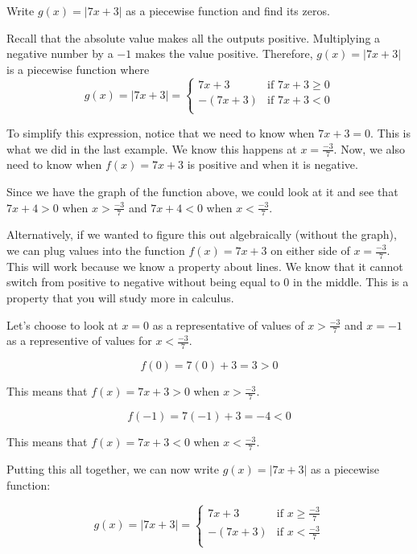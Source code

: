 \documentclass[nooutcomes]{ximera}
\begin{document}
\begin{example}
Write $g(x)=|7x+3|$ as a piecewise function and find its zeros.
\begin{explanation}
Recall that the absolute value makes all the outputs positive.  Multiplying a negative number by a $-1$ makes the value positive.  Therefore, $g(x)=|7x+3|$ is a piecewise function where
$$
  g(x) =|7x+3|=
  \begin{cases}
                                   7x+3 & \text{if $7x+3 \geq 0$} \\
                                   -(7x+3) & \text{if $7x+3 <0$} \\
  \end{cases}
$$

To simplify this expression, notice that we need to know when $7x+3=0$. This is what we did in the last example.  We know this happens at $x=\tfrac{-3}{7}$.  Now, we also need to know when $f(x)=7x+3$ is positive and when it is negative.  

Since we have the graph of the function above, we could look at it and see that $7x+4>0$ when $x>\tfrac{-3}{7}$ and $7x+4<0$ when $x<\tfrac{-3}{7}$.

Alternatively, if we wanted to figure this out algebraically (without the graph), we can plug values into the function  $f(x)=7x+3$ on either side of  $x=\tfrac{-3}{7}$.  This will work because we know a property about lines.  We know that it cannot switch from positive to negative without being equal to 0 in the middle.  This is a property that you will study more in calculus.  

Let's choose to look at $x=0$ as a representative of values of $x>\tfrac{-3}{7}$ and $x=-1$ as a representive of values for $x<\tfrac{-3}{7}$.

$$
f(0)=7(0)+3=3>0
$$

This means that $f(x)=7x+3 >0$ when $x>\tfrac{-3}{7}$.

$$
f(-1)=7(-1)+3=-4<0 
$$

This means that $f(x)=7x+3 <0$ when $x<\tfrac{-3}{7}$.

Putting this all together, we can now write  $g(x)=|7x+3|$ as a piecewise function:

$$
  g(x) =|7x+3|=
  \begin{cases}
                                   7x+3 & \text{if $x \geq \tfrac{-3}{7}$} \\
                                   -(7x+3) & \text{if $x < \tfrac{-3}{7}$} \\
  \end{cases}
$$


\end{explanation}
\end{example}
\end{document}

